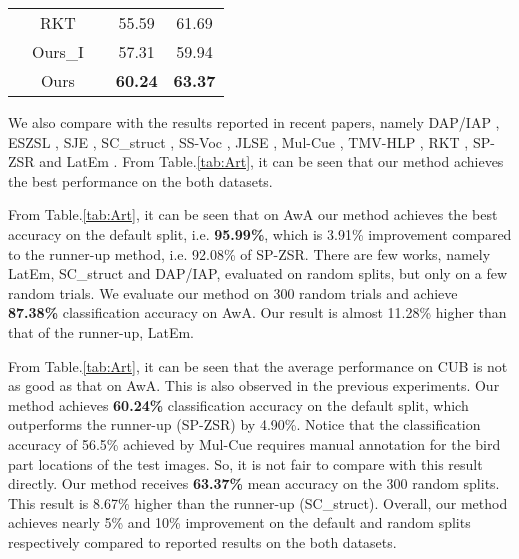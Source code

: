 \documentclass{article}
\begin{document}
\begin{table}[]
\begin{tabular}{c|c|c|c|c}
                     & RKT     &                                                                    &55.59  & 61.69       \\ \cline{2-2} \cline{4-5}
                     & Ours\_I &                                                                        & 57.31  & 59.94       \\ \cline{2-2} \cline{4-5}
                     & Ours    &                                                                  & \textbf{60.24}  & \textbf{63.37}       \\ \hline
\end{tabular}
\end{table}

We also compare with the results reported in recent papers, namely DAP/IAP \cite{lampert2014attribute}, ESZSL \cite{romera2015embarrassingly}, SJE \cite{akata2015evaluation}, SC\_struct \cite{changpinyo2016synthesized}, SS-Voc \cite{fu2016semi}, JLSE \cite{zhang2016zero}, Mul-Cue \cite{akata2016multi}, TMV-HLP \cite{fu2014transductive}, RKT \cite{wang2016relational}, SP-ZSR \cite{zhang2016SPZSL} and LatEm \cite{xian2016latent}. From Table.\ref{tab:Art}, it can be seen that our method achieves the best performance on the both datasets.

From Table.\ref{tab:Art}, it can be seen that on AwA our method achieves the best accuracy on the default split, i.e. \textbf{95.99\%}, which is 3.91\% improvement compared to the runner-up method, i.e. 92.08\% of SP-ZSR. There are few works, namely LatEm, SC\_struct and DAP/IAP, evaluated on random splits, but only on a few random trials. We evaluate our method on 300 random trials and achieve \textbf{87.38\%} classification accuracy on AwA. Our result is almost 11.28\% higher than that of the runner-up, LatEm.

From Table.\ref{tab:Art}, it can be seen that the average performance on CUB is not as good as that on AwA. This is also observed in the previous experiments. Our method achieves \textbf{60.24\%} classification accuracy on the default split, which outperforms the runner-up (SP-ZSR) by 4.90\%. Notice that the classification accuracy of 56.5\% achieved by Mul-Cue requires manual annotation for the bird part locations of the test images. So, it is not fair to compare with this result directly. Our method receives \textbf{63.37\%} mean accuracy on the 300 random splits. This result is 8.67\% higher than the runner-up (SC\_struct). Overall, our method achieves nearly 5\% and 10\% improvement on the default and random splits respectively compared to reported results on the both datasets.
\end{document}
